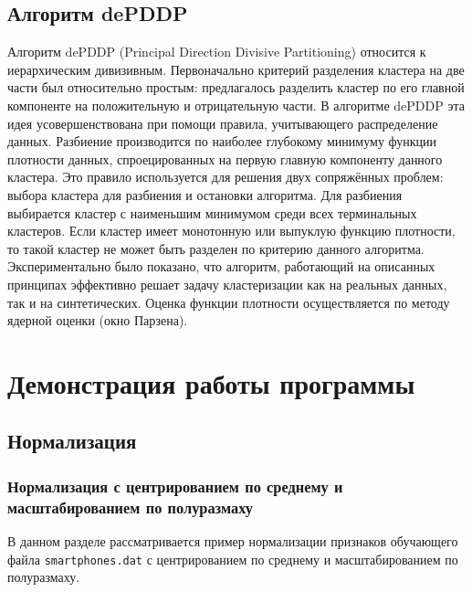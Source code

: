 \documentclass[12pt,tikz]{instruction}
\begin{document}
\subsection{Алгоритм dePDDP} 
Алгоритм dePDDP (Principal Direction Divisive Partitioning) относится к иерархическим дивизивным. Первоначально критерий разделения кластера на две части был относительно простым: предлагалось разделить кластер по его главной компоненте на положительную и отрицательную части. В алгоритме dePDDP эта идея усовершенствована при помощи правила, учитывающего распределение данных. Разбиение производится по наиболее глубокому минимуму функции плотности данных, спроецированных на первую главную компоненту данного кластера. Это правило используется для решения двух сопряжённых проблем: выбора кластера для разбиения и остановки алгоритма. Для разбиения выбирается кластер с наименьшим минимумом среди всех терминальных кластеров. Если кластер имеет монотонную или выпуклую функцию плотности, то такой кластер не может быть разделен по критерию данного алгоритма. Экспериментально было показано, что алгоритм, работающий на описанных принципах эффективно решает задачу кластеризации как на реальных данных, так и на 
синтетических. Оценка функции плотности осуществляется по методу ядерной оценки (окно Парзена).


\section{Демонстрация работы программы}
\subsection{Нормализация}
\subsubsection{Нормализация с центрированием по среднему и масштабированием по полуразмаху}
\label{subsubseq:example_norm1}

В данном разделе рассматривается пример нормализации признаков обучающего файла \texttt{smartphones.dat} с центрированием по среднему и масштабированием по полуразмаху. 
\end{document}
